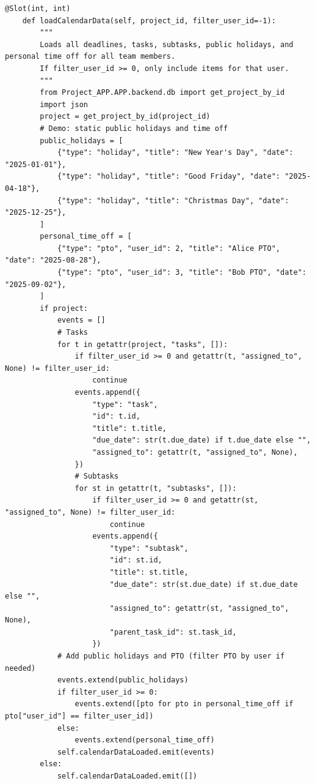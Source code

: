 \documentclass{report}
\begin{document}
\begin{lstlisting}[style=pythonstyle]
    @Slot(int, int)
    def loadCalendarData(self, project_id, filter_user_id=-1):
        """
        Loads all deadlines, tasks, subtasks, public holidays, and personal time off for all team members.
        If filter_user_id >= 0, only include items for that user.
        """
        from Project_APP.APP.backend.db import get_project_by_id
        import json
        project = get_project_by_id(project_id)
        # Demo: static public holidays and time off
        public_holidays = [
            {"type": "holiday", "title": "New Year's Day", "date": "2025-01-01"},
            {"type": "holiday", "title": "Good Friday", "date": "2025-04-18"},
            {"type": "holiday", "title": "Christmas Day", "date": "2025-12-25"},
        ]
        personal_time_off = [
            {"type": "pto", "user_id": 2, "title": "Alice PTO", "date": "2025-08-28"},
            {"type": "pto", "user_id": 3, "title": "Bob PTO", "date": "2025-09-02"},
        ]
        if project:
            events = []
            # Tasks
            for t in getattr(project, "tasks", []):
                if filter_user_id >= 0 and getattr(t, "assigned_to", None) != filter_user_id:
                    continue
                events.append({
                    "type": "task",
                    "id": t.id,
                    "title": t.title,
                    "due_date": str(t.due_date) if t.due_date else "",
                    "assigned_to": getattr(t, "assigned_to", None),
                })
                # Subtasks
                for st in getattr(t, "subtasks", []):
                    if filter_user_id >= 0 and getattr(st, "assigned_to", None) != filter_user_id:
                        continue
                    events.append({
                        "type": "subtask",
                        "id": st.id,
                        "title": st.title,
                        "due_date": str(st.due_date) if st.due_date else "",
                        "assigned_to": getattr(st, "assigned_to", None),
                        "parent_task_id": st.task_id,
                    })
            # Add public holidays and PTO (filter PTO by user if needed)
            events.extend(public_holidays)
            if filter_user_id >= 0:
                events.extend([pto for pto in personal_time_off if pto["user_id"] == filter_user_id])
            else:
                events.extend(personal_time_off)
            self.calendarDataLoaded.emit(events)
        else:
            self.calendarDataLoaded.emit([])


\end{lstlisting}
\end{document}
